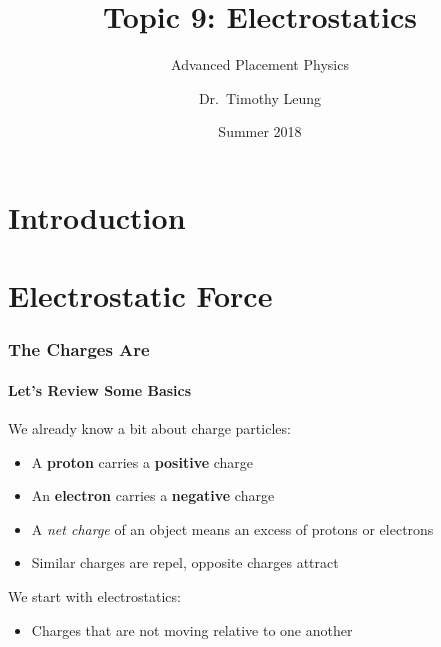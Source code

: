 \documentclass[12pt,aspectratio=169]{beamer}
\title{Topic 9: Electrostatics}
\subtitle{Advanced Placement Physics}
\author[TML]{Dr.\ Timothy Leung}
\institute{Olympiads School}
\date{Summer 2018}
\newcommand{\mb}[1]{\mathbf{#1}}
\begin{document}
\begin{frame}
  \maketitle
\end{frame}


\section[Intro]{Introduction}

%
%  


\section[$\mb{F}_q$]{Electrostatic Force}

\begin{frame}
  \frametitle{The Charges Are}
  \framesubtitle{Let's Review Some Basics}
  We already know a bit about charge particles:
  \begin{itemize}
  \item A \textbf{proton} carries a \textbf{positive} charge
  \item An \textbf{electron} carries a \textbf{negative} charge
  \item A \emph{net charge} of an object means an excess of protons or electrons
  \item Similar charges are repel, opposite charges attract
  \end{itemize}

  \vspace{.2in}We start with electrostatics:
  \begin{itemize}
  \item Charges that are not moving relative to one another
  \end{itemize}
\end{frame}
\end{document}
